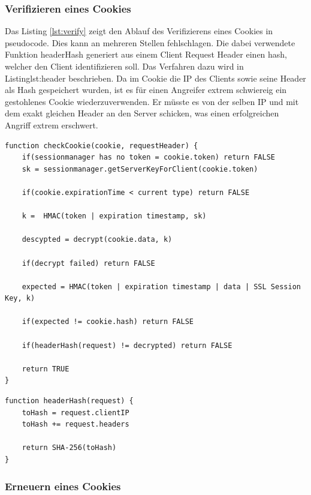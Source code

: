 \subsubsection{Verifizieren eines Cookies}

Das Listing \ref{lst:verify} zeigt den Ablauf des Verifizierens eines Cookies in pseudocode. 
Dies kann an mehreren Stellen fehlschlagen. Die dabei verwendete Funktion headerHash generiert 
aus einem Client Request Header einen hash, welcher den Client identifizieren soll. Das Verfahren
dazu wird in Listing{lst:header} beschrieben. Da im Cookie die IP des Clients sowie seine Header
als Hash gespeichert wurden, ist es für einen Angreifer extrem schwiereig ein gestohlenes Cookie
wiederzuverwenden. Er müsste es von der selben IP und mit dem exakt gleichen Header an den Server
schicken, was einen erfolgreichen Angriff extrem erschwert.
\newline
\begin{lstlisting}[caption=Verifikation eines Cookies,label={lst:verify}]
function checkCookie(cookie, requestHeader) {
    if(sessionmanager has no token = cookie.token) return FALSE
    sk = sessionmanager.getServerKeyForClient(cookie.token)

    if(cookie.expirationTime < current type) return FALSE

    k =  HMAC(token | expiration timestamp, sk)

    descypted = decrypt(cookie.data, k)

    if(decrypt failed) return FALSE

    expected = HMAC(token | expiration timestamp | data | SSL Session Key, k)

    if(expected != cookie.hash) return FALSE

    if(headerHash(request) != decrypted) return FALSE

    return TRUE
}
\end{lstlisting}
\newpage
\begin{lstlisting}[caption=Hashen des Headers eines Client Requests,label={lst:verify}]
function headerHash(request) {
    toHash = request.clientIP
    toHash += request.headers

    return SHA-256(toHash) 
}
\end{lstlisting}

\subsubsection{Erneuern eines Cookies}

